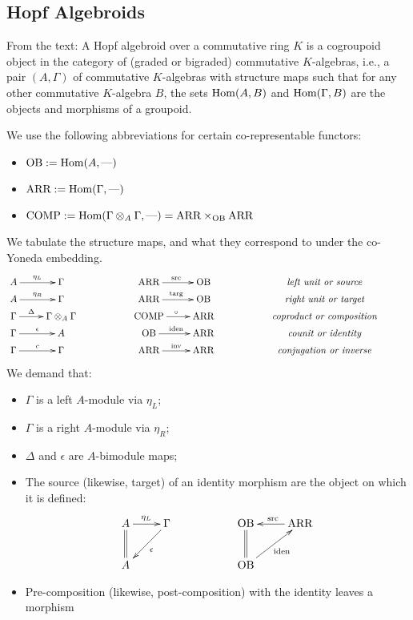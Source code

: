 \documentclass[11pt]{article}
\newcommand\OB{\textup{OB}}
\newcommand\ARR{\textup{ARR}}
\newcommand\COMP{\textup{COMP}}
\begin{document}
\begin{Algebroid Definition}
\section*{Hopf Algebroids}
From the text: A Hopf algebroid over a commutative ring $K$ is a cogroupoid object in the category of (graded or bigraded) commutative $K$-algebras,
i.e., a pair $(A, \Gamma)$ of commutative $K$-algebras with structure maps such that for
any other commutative $K$-algebra $B$, the sets $\operatorname{Hom}(A, B)$ and $\operatorname{Hom}(\Gamma, B)$ are the
objects and morphisms of a groupoid.

We use the following abbreviations for certain co-representable functors:
\begin{itemize}\squishlist
\item $\OB:=\Hom(A,\DASH)$
\item $\ARR:=\Hom(\Gamma,\DASH)$
\item $\COMP:=\Hom(\Gamma\otimes_A\Gamma,\DASH)=\ARR\times_{\OB}\ARR$
\end{itemize}
We tabulate the structure maps, and what they correspond to under the co-Yoneda embedding.
\[\xymatrix@R=.1cm{
A\ar[r]^{\eta_L}&\Gamma&& \ARR\ar[r]^{\textup{src}}&\OB&& \textit{left unit or source} \\
A\ar[r]^{\eta_R}&\Gamma&& \ARR\ar[r]^{\textup{targ}}&\OB&& \textit{right unit or target} \\
\Gamma\ar[r]^-{\Delta}&\Gamma\otimes_A\Gamma
&&\COMP\ar[r]^\circ&\ARR&&\textit{coproduct or composition} \\
\Gamma\ar[r]^{\epsilon}&A&&
\OB\ar[r]^{\textup{iden}}&\ARR&&\textit{counit or identity} \\
\Gamma\ar[r]^{c}&\Gamma&&
\ARR\ar[r]^{\textup{inv}}&\ARR&&\textit{conjugation or inverse} 
&
}\]
We demand that:
\begin{itemize}\squishlist
\item $\Gamma$ is a left $A$-module via $\eta_L$;
\item $\Gamma$ is a right $A$-module via $\eta_R$;
\item $\Delta$ and $\epsilon$ are $A$-bimodule maps;
\item The source (likewise, target) of an
identity morphism are the object on which it is defined:
\[\xymatrix{
A\ar@{=}[d]\ar[r]^{\eta_{L}}& \Gamma\ar[ld]^\epsilon&&
%
\OB\ar@{=}[d];[] \ar[r];[]_{\textup{src}} &\ARR\ar[ld];[]_{\textup{iden}}
\\
A&&&
\OB
}\]
\item Pre-composition (likewise, post-composition) with the identity leaves a morphism

\end{itemize}
\end{Algebroid Definition}
\end{document}
